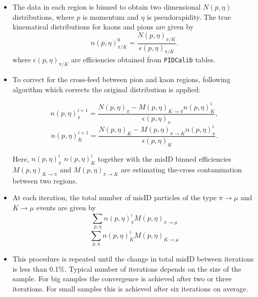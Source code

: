 \begin {itemize}
\begin{itemize}

\item The data in each region is binned to obtain two dimensional $N(p, \eta)$ distributions, where $p$ is momentum and $\eta$ is pseudorapidity. The true kinematical distributions for kaons and pions are given by
\begin{equation}
n(p, \eta )^{0}_{\pi/K} = \frac{N(p, \eta )_{\pi/K}}{\epsilon(p,\eta )_{\pi/K}}.
\end{equation}
where $\epsilon(p,\eta)_{\pi/K}$ are efficiencies obtained from \texttt{PIDCalib} tables.

\item To correct for the cross-feed between pion and kaon regions, following algorithm which corrects the original distribution is applied:

\begin{equation}
n(p, \eta)^{i+1}_{\pi}=\frac{N(p, \eta)_{\pi}-M(p, \eta)_{K \rightarrow \pi} n(p, \eta)^{i}_{K}}{\epsilon(p,\eta)_{\pi}},
\end{equation}
\begin{equation}
n(p, \eta)^{i+1}_{K}=\frac{N(p, \eta)_{K}-M(p, \eta)_{\pi \rightarrow K} n(p, \eta)^{i}_{\pi}}{\epsilon(p,\eta)_{K}}.
\end{equation}

Here, $n(p, \eta)^{i}_{\pi}$  $n(p, \eta)^{i}_{K}$ together with the misID binned efficiencies $M(p, \eta )_{K \rightarrow \pi}$ and $M(p, \eta)_{\pi \rightarrow K}$ are estimating the-cross contamination between two regions.


\item At each iteration, the total number of misID particles of the type $\pi \rightarrow \mu$ and $K \rightarrow \mu$ events are given by
\begin{equation}
\sum_{p,\eta} n(p, \eta)^{i}_{\pi} M(p, \eta)_{\pi\rightarrow\mu} 
\end{equation}
\begin{equation}
\sum_{p,\eta} n(p, \eta)^{i}_{K} M(p, \eta)_{K\rightarrow\mu}
\end{equation}
\item This procedure is repeated until the change in total misID between iterations is less than 0.1\%. Typical number of iterations depends on the size of the sample. For big samples the convergence is achieved after two or three iterations. For small samples this is achieved after six iterations on average.


\end{itemize}
\end{itemize}
